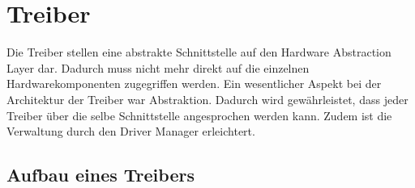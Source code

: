 \section{Treiber}
Die Treiber stellen eine abstrakte Schnittstelle auf den Hardware Abstraction Layer dar. Dadurch muss nicht mehr direkt auf die einzelnen Hardwarekomponenten zugegriffen werden. Ein wesentlicher Aspekt bei der Architektur der Treiber war Abstraktion. Dadurch wird gewährleistet, dass jeder Treiber über die selbe Schnittstelle angesprochen werden kann. Zudem ist die Verwaltung durch den Driver Manager erleichtert.

\subsection{Aufbau eines Treibers}


\pagebreak 